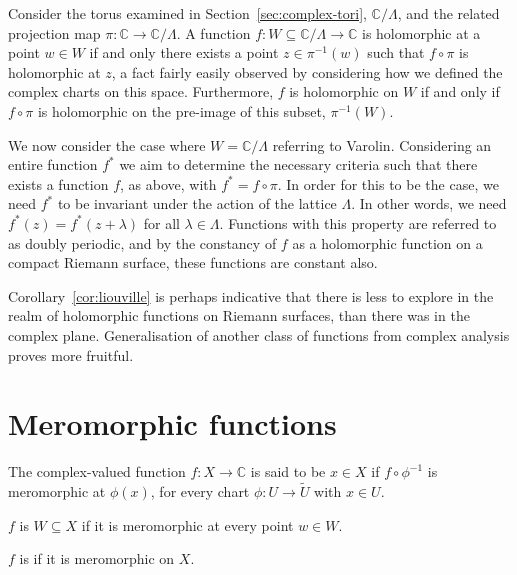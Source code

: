 \begin{example}
	Consider the torus examined in Section~\ref{sec:complex-tori}, $
		\mathbb{C}/\Lambda $, and the related projection map $ \pi:\mathbb{C} \to
		\mathbb{C}/\Lambda $. A function $ f:W \subseteq \mathbb{C}/\Lambda \to
		\mathbb{C} $ is holomorphic at a point $ w \in W $ if and only there exists a
	point $ z \in \pi ^{-1}(w) $ such that $ f \circ \pi $ is holomorphic at $ z $,
	a fact fairly easily observed by considering how we defined the complex charts
	on this space. Furthermore, $ f $ is holomorphic on $ W $ if and only if $ f
		\circ \pi $ is holomorphic on the pre-image of this subset, $ \pi ^{-1}(W) $.

	We now consider the case where $ W = \mathbb{C}/\Lambda $ referring to
	Varolin\sidenotemark. Considering an entire function $ f ^{*} $ we aim to
	determine the necessary criteria such that there exists a function $ f $, as
	above, with $ f ^{*} = f \circ \pi $. In order for this to be the case,
	we need $ f ^{*} $ to be invariant under the action of the lattice $ \Lambda
	$. In other words, we need $ f ^{*}(z) = f ^{*}(z + \lambda) $ for all $
		\lambda \in \Lambda $. Functions with this property are referred to as doubly
	periodic, and by the constancy of $ f $ as a holomorphic function on a compact
	Riemann surface, these functions are constant also.
\end{example}

Corollary~\ref{cor:liouville} is perhaps indicative that there is less to
explore in the realm of holomorphic functions on Riemann surfaces, than there
was in the complex plane. Generalisation of another class of functions from
complex analysis proves more fruitful.

\section{Meromorphic functions}\label{sec:mero-fcts}
\begin{definition}[Meromorphicity]
	The complex-valued function $ f:X \to \mathbb{C} $ is said to be
	 $ x \in X $ if $ f \circ \phi ^{-1} $ is meromorphic
	at $ \phi(x) $, for every chart $ \phi:U \to \tilde{U} $ with $ x \in U $.

	$ f $ is  $ W \subseteq X $ if it is meromorphic at
	every point $ w \in W $.

	$ f $ is  if it is meromorphic on $ X $.
\end{definition}


